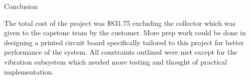 \documentclass[final]{beamer}
\newlength{\sepwidth}
\newlength{\colwidth}
\newcommand{\separatorcolumn}{\begin{column}{\sepwidth}\end{column}}
\begin{document}
\begin{frame}[t]
\begin{columns}[t]
\begin{column}{\colwidth}
  \begin{block}{Conclusion}

    \qquad The total cost of the project was \$831.75 excluding the collector which was given to the capstone team by the customer. More prep work could be done in designing a printed circuit board specifically tailored to this project for better performance of the system. All constraints outlined were met except for the vibration subsystem which needed more testing and thought of practical implementation.

    \begin{table}
    \centering
    \caption{Bill of Materials.}
    \end{table}

  \end{block}
  
\end{column}
\separatorcolumn

\end{columns}
\end{frame}
\end{document}
